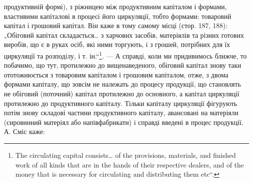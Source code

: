 \parcont{}  %
продуктивній формі), з ріжницею між продуктивним капіталом і формами,
властивими капіталові в процесі його циркуляції, тобто формами: товаровий
капітал і грошовий капітал. Він каже в тому самому місці (стор.
187, 188): „Обіговий капітал складається\dots{} з харчових засобів, матеріялів
та різних готових виробів, що є в руках осіб, які ними торгують, і з
грошей, потрібних для їх циркуляції та розподілу, і т. ін.“\footnote*{
The circulating capital consists\dots{} of the provisions, materials, and finished work
of all kinds that are in the hands of their respective dealers, and of the money
that is necessary for circulating and distributing them etc“.
}. — А справді,
коли ми придивимось ближче, то побачимо, що тут, протилежно до вищенаведеного,
обіговий капітал знову таки ототожнюється з товаровим
капіталом і грошовим капіталом, отже, з двома формами капіталу, що зовсім
не належать до процесу продукції, що становлять не обіговий (поточний)
капітал протилежно до основного, а капітал циркуляції протилежно до продуктивного
капіталу. Тільки  капіталу циркуляції фігурують потім
знову складові частини продуктивного капіталу, авансовані на матеріяли
(сировинний матеріял або напівфабрикати) і справді введені в процес продукції.
А. Сміс каже:

